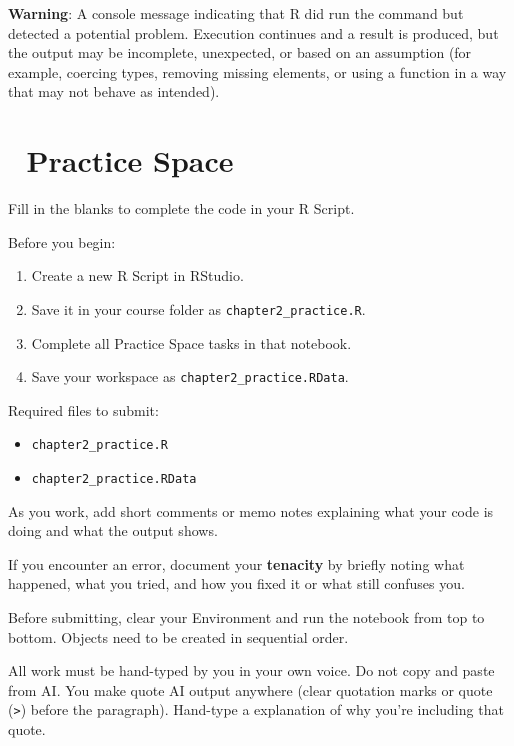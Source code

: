 \documentclass[
  12pt,
]{scrreprt}
\providecommand{\tightlist}{%
  \setlength{\itemsep}{0pt}\setlength{\parskip}{0pt}}
\begin{document}
\textbf{Warning}: A console message indicating that R did run the
command but detected a potential problem. Execution continues and a
result is produced, but the output may be incomplete, unexpected, or
based on an assumption (for example, coercing types, removing missing
elements, or using a function in a way that may not behave as intended).

\chapter{📝 Practice Space}\label{practice-space}

Fill in the blanks to complete the code in your R Script.

Before you begin:

\begin{enumerate}
\def\labelenumi{\arabic{enumi}.}
\tightlist
\item
  Create a new R Script in RStudio.
\item
  Save it in your course folder as \texttt{chapter2\_practice.R}.
\item
  Complete all Practice Space tasks in that notebook.
\item
  Save your workspace as \texttt{chapter2\_practice.RData}.
\end{enumerate}

Required files to submit:

\begin{itemize}
\tightlist
\item
  \texttt{chapter2\_practice.R}
\item
  \texttt{chapter2\_practice.RData}
\end{itemize}

As you work, add short comments or memo notes explaining what your code
is doing and what the output shows.

If you encounter an error, document your \textbf{tenacity} by briefly
noting what happened, what you tried, and how you fixed it or what still
confuses you.

Before submitting, clear your Environment and run the notebook from top
to bottom. Objects need to be created in sequential order.

All work must be hand-typed by you in your own voice. Do not copy and
paste from AI. You make quote AI output anywhere (clear quotation marks
or quote (\texttt{\textgreater{}}) before the paragraph). Hand-type a
explanation of why you're including that quote.
\end{document}
